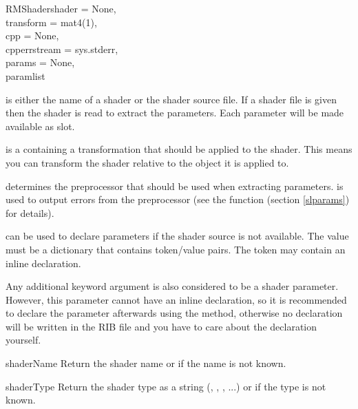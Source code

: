 \begin{classdesc}{RMShader}{shader = None, \\
                            transform = mat4(1), \\
                            cpp = None, \\
                            cpperrstream = sys.stderr, \\
                            params = None, \\
                            paramlist}
	
 is either the name of a shader or the shader source file.
If a shader file is given then the shader is read to extract the parameters.
Each parameter will be made available as slot.

 is a  containing a transformation that should
be applied to the shader. This means you can transform the shader relative
to the object it is applied to.

 determines the preprocessor that should be used when extracting
parameters.  is used to output errors from the
preprocessor (see the function  (section
\ref{slparams}) for details).

 can be used to declare parameters if the shader source
is not available. The value must be a dictionary that contains
token/value pairs. The token may contain an inline declaration. 

Any additional keyword argument is also considered to be a shader
parameter. However, this parameter cannot have an inline declaration,
so it is recommended to declare the parameter afterwards using the
 method, otherwise no declaration will be 
written in the RIB file and you have to care about the declaration
yourself.
\end{classdesc}

\begin{methoddesc}{shaderName}{}
Return the shader name or  if the name is not known.
\end{methoddesc}

\begin{methoddesc}{shaderType}{}
Return the shader type as a string (, ,
, ...) or  if the type is not known.
\end{methoddesc}

